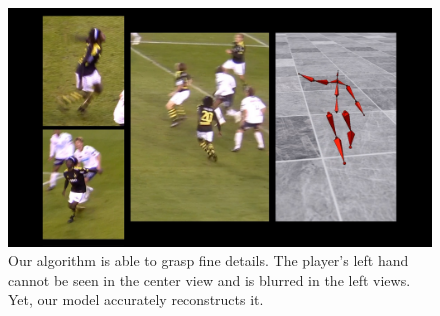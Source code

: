 \begin{figure}[tbh]
\centering
\includegraphics[width=\linewidth]{./images/football_hand_wave.jpg}
\setlength{\abovecaptionskip}{-5pt plus 3pt minus 2pt}
\setlength{\belowcaptionskip}{-5pt plus 3pt minus 2pt}
\caption{Our algorithm is able to grasp fine details. The player's left hand cannot be seen in the center view and is blurred in the left views. Yet, our model accurately reconstructs it. }
\label{fig:quality_football_hand_wave}
\end{figure}

